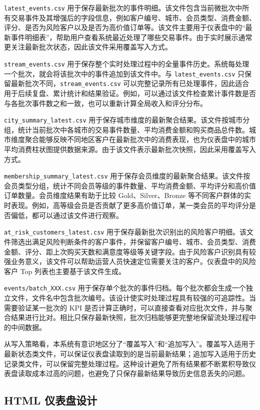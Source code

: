 \documentclass[12pt,hyperref,a4paper,UTF8]{ctexart}
\begin{document}
\texttt{latest\_events.csv} 用于保存最新批次的事件明细。该文件包含当前微批次中所有交易事件及其增强后的字段信息，例如客户编号、城市、会员类型、消费金额、评分、是否为风险客户以及是否为高价值订单等。该文件主要用于仪表盘中的“最新事件明细表”，帮助用户查看系统最近处理了哪些交易事件。由于实时展示通常更关注最新批次状态，因此该文件采用覆盖写入方式。

\texttt{stream\_events.csv} 用于保存整个实时处理过程中的全量事件历史。系统每处理一个批次，就会将该批次中的事件追加到该文件中。与 \texttt{latest\_events.csv} 只保留最新批次不同，\texttt{stream\_events.csv} 可以完整记录所有已处理事件，因此适合用于后续复盘、累计统计和结果验证。例如，可以通过该文件检查累计事件数是否与各批次事件数之和一致，也可以重新计算全局收入和评分分布。

\texttt{city\_summary\_latest.csv} 用于保存城市维度的最新聚合结果。该文件按城市分组，统计当前批次中各城市的交易事件数量、平均消费金额和购买商品总件数。城市维度聚合能够反映不同地区客户在最新批次中的消费表现，也为仪表盘中的城市平均消费柱状图提供数据来源。由于该文件表示最新批次快照，因此采用覆盖写入方式。

\texttt{membership\_summary\_latest.csv} 用于保存会员维度的最新聚合结果。该文件按会员类型分组，统计不同会员等级的事件数量、平均消费金额、平均评分和高价值订单数量。会员维度结果有助于比较 Gold、Silver、Bronze 等不同客户群体的实时表现。例如，高等级会员是否贡献了更多高价值订单，某一类会员的平均评分是否偏低，都可以通过该文件进行观察。

\texttt{at\_risk\_customers\_latest.csv} 用于保存最新批次识别出的风险客户明细。该文件筛选出满足风险判断条件的客户事件，并保留客户编号、城市、会员类型、消费金额、评分、距上次购买天数和满意度等级等关键字段。由于风险客户识别具有较强业务意义，该文件可以帮助运营人员快速定位需要关注的客户。仪表盘中的风险客户 Top 列表也主要基于该文件生成。

\texttt{events/batch\_XXX.csv} 用于保存单个批次的事件归档。每个批次都会生成一个独立文件，文件名中包含批次编号。该设计使实时处理过程具有较强的可追踪性。当需要验证某一批次的 KPI 是否计算正确时，可以直接查看对应批次文件，并与聚合结果进行比对。相比只保存最新快照，批次归档能够更完整地保留流处理过程中的中间数据。

从写入策略看，本系统有意识地区分了“覆盖写入”和“追加写入”。覆盖写入适用于最新状态类文件，可以保证仪表盘读取到的是当前最新结果；追加写入适用于历史记录类文件，可以保留完整处理过程。这种设计避免了所有结果都不断累积导致仪表盘读取成本过高的问题，也避免了只保存最新结果导致历史信息丢失的问题。

\subsection{HTML 仪表盘设计}
\end{document}
